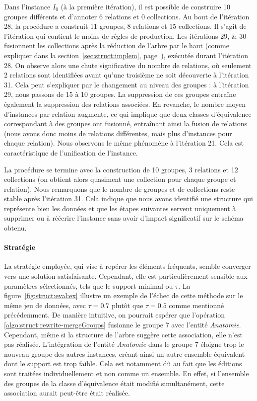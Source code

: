 Dans l'instance $I_0$ (à la première itération), il est possible de construire \num{10} groupes différents et d'annoter \num{6} relations et \num{0} collections.
Au bout de l'itération \num{28}, la procédure a construit \num{11} groupes, \num{8} relations et \num{15} collections.
Il s'agit de l'itération qui contient le moins de règles de production.
Les itérations \numlist{29;30} fusionnent les collections après la réduction de l'arbre par le haut (comme expliquer dans la section~\ref{sec:struct:implem}, page~\pageref{sec:struct:implem}), exécutée durant l'itération \num{28}.
On observe alors une chute significative du nombre de relations, où seulement \num{2} relations sont identifiées avant qu'une troisième ne soit découverte à l'itération \num{31}.
Cela peut s'expliquer par le changement au niveau des groupes : à l'itération \num{29}, nous passons de \num{15} à \num{10} groupes.
La suppression de ces groupes entraîne également la suppression des relations associées.
En revanche, le nombre moyen d'instances par relation augmente, ce qui implique que deux classes d'équivalence correspondant à des groupes ont fusionné, entraînant ainsi la fusion de relations (nous avons donc moins de relations différentes, mais plus d'instances pour chaque relation).
Nous observons le même phénomène à l'itération \num{21}.
Cela est caractéristique de l'unification de l'instance.

La procédure se termine avec la construction de \num{10} groupes, \num{3} relations et \num{12} collections (on obtient alors quasiment une collection pour chaque groupe et relation).
Nous remarquons que le nombre de groupes et de collections reste stable après l'itération \num{31}.
Cela indique que nous avons identifié une structure qui représente bien les données et que les étapes suivantes servent uniquement à supprimer ou à réécrire l'instance sans avoir d'impact significatif sur le schéma obtenu.

\paragraph{Stratégie}
La stratégie employée, qui vise à repérer les éléments fréquents, semble converger vers une solution satisfaisante.
Cependant, elle est particulièrement sensible aux paramètres sélectionnés, tels que le support minimal ou $\tau$.
La figure~\ref{fig:struct:eval:ex} illustre un exemple de l'échec de cette méthode sur le même jeu de données, avec $\tau = 0.7$ plutôt que $\tau=0.5$ comme mentionné précédemment.
De manière intuitive, on pourrait espérer que l'opération \ref{algo:struct:rewrite-mergeGroups} fusionne le groupe 7 avec l'entité \emph{Anatomie}.
Cependant, même si la structure de l'arbre suggère cette association, elle n'est pas réalisée.
L'intégration de l'entité \emph{Anatomie} dans le groupe 7 éloigne trop le nouveau groupe des autres instances, créant ainsi un autre ensemble équivalent dont le support est trop faible.
Cela est notamment dû au fait que les éditions sont traitées individuellement et non comme un ensemble.
En effet, si l'ensemble des groupes de la classe d'équivalence était modifié simultanément, cette association aurait peut-être était réalisée.

